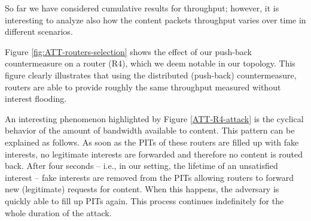 \documentclass[10pt,conference,letterpaper]{IEEEtran}
\begin{document}
So far we have considered cumulative results for throughput; however, it is interesting to analyze also how the content packets throughput varies over time in different scenarios.


{Figure \ref {fig:ATT-routers-selection} shows the effect of our push-back countermeasure on a router (R4), which we deem notable in our topology.
This figure clearly illustrates that using the distributed (push-back) countermeasure, routers are able to provide roughly the same throughput measured without interest flooding.}

An interesting phenomenon highlighted by 
Figure \ref{ATT-R4-attack} is the cyclical behavior of the amount of bandwidth available to content.
This pattern can be explained as follows. As soon as the PITs of these routers are filled up with fake interests, no legitimate interests are forwarded and therefore no content is routed back. After four seconds -- i.e., in our setting, the lifetime of an unsatisfied interest  -- fake interests are removed from the PITs allowing routers to forward new (legitimate) requests for content. When this happens, the adversary is quickly able to fill up PITs again. This process continues indefinitely for the whole duration of the attack.




\begin{comment}
\begin{figure*}[t]
 \centering
 \subfigure[R9: baseline]
   {\texttt{[image: Images/dfn\_bandwidth\_cr9\_contents\_baseline]}\label{DFN-routers-selection-R9-base}}
 \subfigure[R9: attack]
   {\texttt{[image: Images/dfn\_bandwidth\_cr9\_contents\_attackers3]}\label{DFN-routers-selection-R9-att}}
 \subfigure[R9: rate-based countermeasure]
   {\texttt{[image: Images/dfn\_bandwidth\_cr9\_contents\_simple]}\label{DFN-routers-selection-R9-count}}
 \hspace{5mm}
\caption{DFN: content throughput (abs. values)}
\label{fig:DFN-routers-selection}
 \end{figure*}
\end{comment}





\begin{figure*}[htp!]
 \centering
 \hspace{1mm}
 \hspace{1mm}
   \caption{AT\&T: content throughput  (abs.~values)}
\label{fig:ATT-routers-selection}
 \end{figure*}
\end{document}
